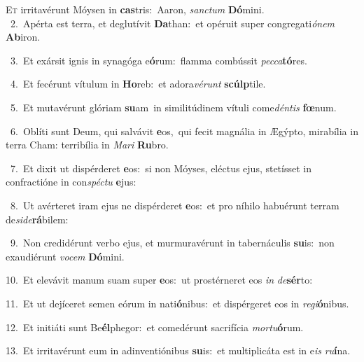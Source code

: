\lettrine{\initial\textcolor{\initialcolor}{E}}{t} irritavérunt Móysen in \textbf{cas}\-tris:~\star Aaron, \textit{sanc}\-\textit{tum} \textbf{Dó}\-mini.\\
{\numbfont\textcolor{\numbcolor}{~2.}}~Apérta est terra, et deglutívit \textbf{Da}\-than:~\star et opéruit super congregati\-\textit{ó}\-\textit{nem} \textbf{Ab}\-iron.\par
{\numbfont\textcolor{\numbcolor}{~3.}}~Et exársit ignis in synagóga e\-\textbf{ó}\-rum:~\star flamma combússit \textit{pec}\-\textit{ca}\textbf{tó}res.\par
{\numbfont\textcolor{\numbcolor}{~4.}}~Et fecérunt vítulum in \textbf{Ho}\-reb:~\star et adora\-\textit{vé}\-\textit{runt} \textbf{scúlp}\-tile.\par
{\numbfont\textcolor{\numbcolor}{~5.}}~Et mutavérunt glóriam \textbf{su}\-am~\star in similitúdinem vítuli come\-\textit{dén}\-\textit{tis} \textbf{fœ}\-num.\par
{\numbfont\textcolor{\numbcolor}{~6.}}~Oblíti sunt Deum, qui salvávit \textbf{e}\-os,~\star qui fecit magnália in Ægýpto, mirabília in terra Cham: terribília in \textit{Ma}\-\textit{ri} \textbf{Ru}\-bro.\par
{\numbfont\textcolor{\numbcolor}{~7.}}~Et dixit ut dispérderet \textbf{e}\-os:~\star si non Móyses, eléctus ejus, stetísset in confractióne in con\-\textit{spéc}\-\textit{tu} \textbf{e}\-jus:\par
{\numbfont\textcolor{\numbcolor}{~8.}}~Ut avérteret iram ejus ne dispérderet \textbf{e}\-os:~\star et pro níhilo habuérunt terram de\-\textit{si}\-\textit{de}\textbf{rá}bilem:\par
{\numbfont\textcolor{\numbcolor}{~9.}}~Non credidérunt verbo ejus, et murmuravérunt in tabernáculis \textbf{su}\-is:~\star non exaudiérunt \textit{vo}\-\textit{cem} \textbf{Dó}\-mini.\par
{\numbfont\textcolor{\numbcolor}{10.}}~Et elevávit manum suam super \textbf{e}\-os:~\star ut prostérneret eos \textit{in} \textit{de}\-\textbf{sér}to:\par
{\numbfont\textcolor{\numbcolor}{11.}}~Et ut dejíceret semen eórum in nati\-\textbf{ó}\-nibus:~\star et dispérgeret eos in \textit{re}\-\textit{gi}\textbf{ó}nibus.\par
{\numbfont\textcolor{\numbcolor}{12.}}~Et initiáti sunt Be\-\textbf{él}\-phegor:~\star et comedérunt sacrifícia \textit{mor}\-\textit{tu}\textbf{ó}rum.\par
{\numbfont\textcolor{\numbcolor}{13.}}~Et irritavérunt eum in adinventiónibus \textbf{su}\-is:~\star et multiplicáta est in e\textit{is} \textit{ru}\-\textbf{í}na.\par

